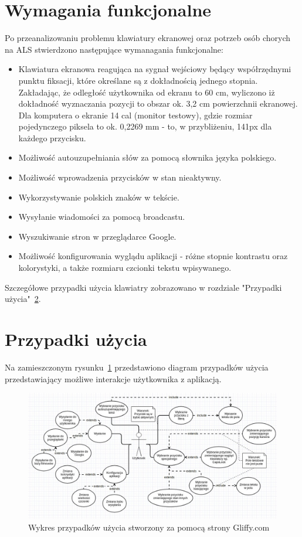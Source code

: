 \documentclass[twoside,a4paper]{book}
\begin{document}
\section{Wymagania funkcjonalne}
Po przeanalizowaniu problemu klawiatury ekranowej oraz potrzeb osób chorych na ALS stwierdzono następujące wymanagania funkcjonalne:
\begin{itemize}
\item Klawiatura ekranowa reagująca na sygnał wejściowy będący współrzędnymi punktu fiksacji, które określane są z dokładnością jednego stopnia. Zakładając, że odległość użytkownika od ekranu to 60 cm, wyliczono iż dokładność wyznaczania pozycji to obszar ok. 3,2 cm powierzchnii ekranowej. Dla komputera o ekranie 14 cal (monitor testowy), gdzie rozmiar pojedynczego piksela to ok. 0,2269 mm - to, w przybliżeniu, 141px dla każdego przycisku. 
\item Możliwość autouzupełniania słów za pomocą słownika języka polskiego.
\item Możliwość wprowadzenia przycisków w stan nieaktywny. 
\item Wykorzystywanie polskich znaków w tekście. 
\item Wysyłanie wiadomości za pomocą broadcastu. 
\item Wyszukiwanie stron w przeglądarce Google.
\item Możliwość konfigurowania wyglądu aplikacji - różne stopnie kontrastu oraz kolorystyki, a także rozmiaru czcionki tekstu wpisywanego. 
\end{itemize}
Szczegółowe przypadki użycia klawiatry zobrazowano w rozdziale "Przypadki użycia"~\ref{sec:uml}.

\section{Przypadki użycia}
  \label{sec:uml}
  Na zamieszczonym rysunku~\ref{fig:useCase} przedstawiono diagram przypadków użycia przedstawiający możliwe interakcje użytkownika z aplikacją. 
\begin{figure}[!h]
		\centering
		\includegraphics[scale=0.4]{img/useCase.jpg}
		\caption{Wykres przypadków użycia stworzony za pomocą strony Gliffy.com}
		\label{fig:useCase}
\end{figure}
\end{document}
